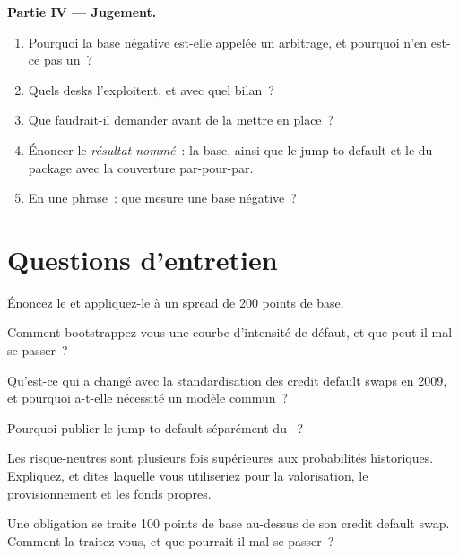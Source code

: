 \begin{problem}
\medskip\noindent\textbf{Partie IV --- Jugement.}
\begin{enumerate}[resume]
\item Pourquoi la base négative est-elle appelée un arbitrage, et pourquoi n'en est-ce pas un~?
\item Quels desks l'exploitent, et avec quel bilan~?
\item Que faudrait-il demander avant de la mettre en place~?
\item Énoncer le \emph{résultat nommé}~: la base, ainsi que le jump-to-default et le  du package
avec la couverture par-pour-par.
\item En une phrase~: que mesure une base négative~?
\end{enumerate}
\end{problem}

\section{Questions d'entretien}

\begin{interviewq}\label{iq:rc:reduced-form-credit:1}
Énoncez le  et appliquez-le à un spread de 200 points de base.
\end{interviewq}

\begin{interviewq}\label{iq:rc:reduced-form-credit:2}
Comment bootstrappez-vous une courbe d'intensité de défaut, et que peut-il mal se passer~?
\end{interviewq}

\begin{interviewq}\label{iq:rc:reduced-form-credit:3}
Qu'est-ce qui a changé avec la standardisation des credit default swaps en 2009, et pourquoi a-t-elle nécessité un
modèle commun~?
\end{interviewq}

\begin{interviewq}\label{iq:rc:reduced-form-credit:4}
Pourquoi publier le jump-to-default séparément du ~?
\end{interviewq}

\begin{interviewq}\label{iq:rc:reduced-form-credit:5}
Les  risque-neutres sont plusieurs fois supérieures aux probabilités historiques. Expliquez, et dites
laquelle vous utiliseriez pour la valorisation, le provisionnement et les fonds propres.
\end{interviewq}

\begin{interviewq}\label{iq:rc:reduced-form-credit:6}
Une obligation se traite 100 points de base au-dessus de son credit default swap. Comment la traitez-vous, et que
pourrait-il mal se passer~?
\end{interviewq}
